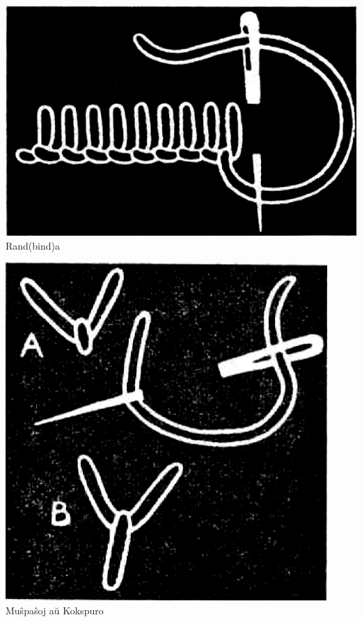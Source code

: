\begin{center}\includegraphics[keepaspectratio,width=\textwidth,height=0.75\textheight]{9.png}\\
Rand(bind)a\end{center}

\begin{center}\includegraphics[keepaspectratio,width=\textwidth,height=0.75\textheight]{10.png}\\
Muŝpaŝoj aŭ Kokspuro\end{center}

